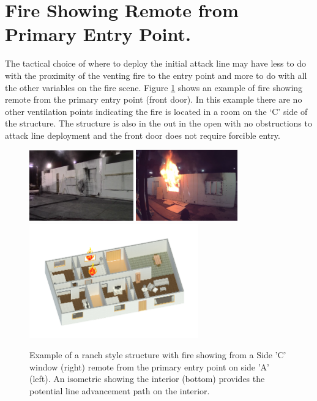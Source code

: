 \documentclass[12pt,oneside]{book}
\begin{document}
\section{Fire Showing Remote from Primary Entry Point.}
The tactical choice of where to deploy the initial attack line may have less to do with the proximity of the venting fire to the entry point and more to do with all the other variables on the fire scene. Figure \ref{fig:TC_Fire_Remote_Entry_Example} shows an example of fire showing remote from the primary entry point (front door). In this example there are no other ventilation points indicating the fire is located in a room on the `C' side of the structure. The structure is also in the out in the open with no obstructions to attack line deployment and the front door does not require forcible entry. 

\begin{figure}[H]
\centering
\includegraphics[width=0.4\textwidth]{../0_Images/Tactical_Considerations/Fire_Remote_Entry/Side_A}
\includegraphics[width=0.39\textwidth]{../0_Images/Tactical_Considerations/Fire_Remote_Entry/Side_C} 
\includegraphics[width=0.65\textwidth]{../0_Images/Tactical_Considerations/Fire_Remote_Entry/ISO}
\caption[Example - Fire Showing - Remote from Entry Point]{Example of a ranch style structure with fire showing from a Side 'C' window (right) remote from the primary entry point on side 'A' (left). An isometric showing the interior (bottom) provides the potential line advancement path on the interior.}
\label{fig:TC_Fire_Remote_Entry_Example}
\end{figure}
\end{document}
